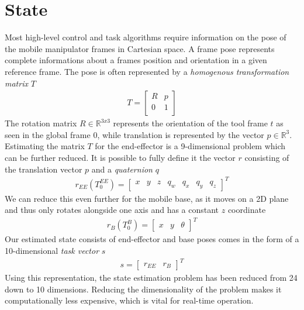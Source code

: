 \documentclass[times, utf8, diplomski, english]{fer}
\begin{document}
\section{State}\label{section:State}
Most high-level control and task algorithms require information on the pose of the mobile manipulator frames in Cartesian space. 
A frame pose represents complete informations about a frames position and orientation in a given reference frame.
The pose is often represented by a \textit{homogenous transformation matrix} $T$
\begin{align}
T =
\begin{bmatrix}
R & p\\
0 & 1\\
\end{bmatrix}
\label{transform}
\end{align}
The rotation matrix $R \in \mathbb{R}^{3x3}$ represents the orientation of the tool frame $t$ as seen in the global frame $0$, while translation is represented by the vector $p \in \mathbb{R}^3$.
Estimating the matrix $T$ for the end-effector is a 9-dimensional problem which can be further reduced. 
It is possible to fully define it the vector $r$ consisting of the translation vector $p$ and a \textit{quaternion} $q$
\begin{align} \label{eq:pose}
r_{EE}\left(T_{0}^{EE}\right) = 
\begin{bmatrix}
x& y& z& q_w& q_x& q_y& q_z
\end{bmatrix}^T
\end{align}
We can reduce this even further for the mobile base, as it moves on a 2D plane and thus only rotates alongside one axis and has a constant $z$ coordinate
\begin{align}
r_{B}\left(T_{0}^{B}\right) = 
\begin{bmatrix}
x& y& \theta
\end{bmatrix}^T
\end{align}
Our estimated state consists of end-effector and base poses comes in the form of a 10-dimensional \textit{task vector} $s$
\begin{align}\label{eq:task_vector}
s = 
\begin{bmatrix}
r_{EE}& r_B
\end{bmatrix}^T
\end{align}
Using this representation, the state estimation problem has been reduced from 24 down to 10 dimensions.
Reducing the dimensionality of the problem makes it computationally less expensive, which is vital for real-time operation.
\end{document}
